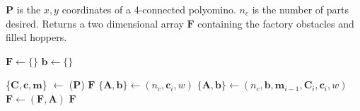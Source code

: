\begin{algorithm} 
\newcommand\algotext[1]{\end{algorithmic}#1\begin{algorithmic}[1]}
\caption{ ($\mathbf{P}, n_c$)\label{alg:BuildFactory}}
$\mathbf{P}$ is the $x,y$ coordinates of a 4-connected polyomino.  $n_c$ is the number of parts desired. 
Returns a two dimensional array $ \mathbf{F} $ containing the factory obstacles and filled hoppers.
\begin{algorithmic}[1]
\State$\mathbf{F} \leftarrow \{\}$  
\State$ \mathbf{b} \leftarrow \{\}$  

\State \{$\mathbf{C},\mathbf{c}, \mathbf{m}$\} $  \leftarrow$ {}($\mathbf{P}$)
 \State \Return  $ \mathbf{F} $
 \EndIf 
 \State$\{ \mathbf{A}, \mathbf{b} \}\leftarrow${}$(n_c, \mathbf{c}_i,w)$
 \State$\{\mathbf{A},\mathbf{b}\}\leftarrow${}$(n_c,\mathbf{b}, \mathbf{m}_{i-1},\mathbf{C}_i, \mathbf{c}_i,w)$
 \State$ \mathbf{F} \leftarrow${}$(\mathbf{F},\mathbf{A})$
\EndFor
\State \Return  $ \mathbf{F} $
\end{algorithmic}
\end{algorithm} 
 
 
 

 
 
